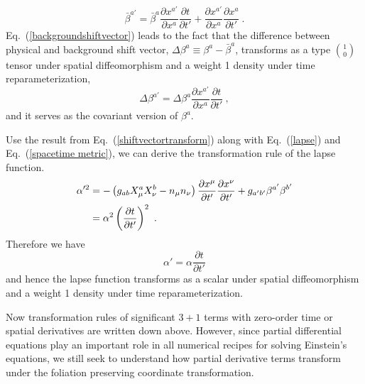 \begin{equation}\label{backgroundshiftvector}
{\bar \beta}^{a'} = {\bar \beta}^{a}\frac{\partial x^{a'}}{\partial x^{a}}\frac{\partial t}{\partial t'} + \frac{\partial x^{a'}}{\partial x^{a}}\frac{\partial x^{a}}{\partial t'} \ .
\end{equation}
Eq.~(\ref{backgroundshiftvector}) leads to the fact that the difference between physical and background shift vector, $\Delta \beta^{a} \equiv \beta^{a} - {\bar \beta}^{a}$, transforms as a type $1 \choose 0$ tensor under spatial diffeomorphism and a weight 1 density under time reparameterization, 
\begin{equation}\label{covariantshiftvector}
	\Delta \beta^{a'} = \Delta \beta^{a}\frac{\partial x^{a'}}{\partial x^{a}}\frac{\partial t}{\partial t'} \ ,
\end{equation}
and it serves as the covariant version of $\beta^{a}$. 

Use the result from Eq.~(\ref{shiftvectortransform}) along with Eq.~(\ref{lapse}) and Eq.~(\ref{spacetime metric}), we can derive the transformation rule of the lapse function. 
\begin{align*}
\alpha'^{2} & = - \left(g_{ab}X^{a}_{\mu}X^{b}_{\nu} - n_{\mu}n_{\nu}\right)\frac{\partial x^{\mu}}{\partial t'}\frac{\partial x^{\nu}}{\partial t'} + g_{a'b'}\beta^{a'}\beta^{b'}\notag\\ 
& = \alpha^2\left(\frac{\partial t}{\partial t'}\right)^{2} \ .
\end{align*}
Therefore we have
\begin{equation}\label{lapsetransform}
\alpha' = \alpha\frac{\partial t}{\partial t'}
\end{equation}
and hence the lapse function transforms as a scalar under spatial diffeomorphism and a weight 1 density under time reparameterization. 

Now transformation rules of significant $3 + 1$ terms with zero-order time or spatial derivatives are written down above. However, since partial differential equations play an important role in all numerical recipes for solving Einstein's equations, we still seek to understand how partial derivative terms transform under the foliation preserving coordinate transformation. 

